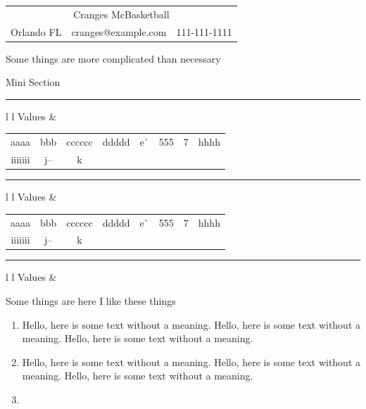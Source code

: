 \documentclass[12pt, a4paper]{article}
\begin{document}
\setlength{\arrayrulewidth}{0.6mm}

\begin{center}
    \begin{tabular}{c|c|c}
        \multicolumn{3}{c}{Cranges McBasketball} \\
        Orlando FL & cranges@example.com & 111-111-1111
    \end{tabular}
\end{center}

{\selectfont
Some things are more complicated than necessary
}

\selectfont
Mini Section
\\[-6mm]


\textcolor{gray}{\rule{\textwidth}{4pt}}


\begin{tabular}{l l}
Values \hspace{4 mm} &
\begin{tabular}{*{7}{c|}c}
    aaaa & bbb & cccccc & ddddd & e^^ & 555 & 7 & hhhh \\
    \arrayrulecolor[HTML]{FFFFFF}
    \hline
    \arrayrulecolor{gray}
    iiiiiii & j-- & k
\end{tabular}
\end{tabular}

\textcolor{gray}{\rule{\textwidth}{2pt}}

\begin{tabular}{l l}
    Values &
    \begin{tabular}{*{7}{c|}c}

        aaaa & bbb & cccccc & ddddd & e^^ & 555 & 7 & hhhh \\
        \arrayrulecolor[HTML]{FFFFFF}
        \hline
        \arrayrulecolor{gray}
        iiiiiii & j-- & k
    \end{tabular}
    \end{tabular}


\textcolor{gray}{\rule{\textwidth}{2pt}}


\begin{tabularx}{\textwidth}{l l}
    Values & 
     \end{tabularx}

\vspace{10mm}
Some things are here
I like these things

\newcommand{\rando} {Hello, here is some text without a meaning. Hello, here is some text without a meaning. Hello, here is some text without a meaning.}

\begin{enumerate}
    \item \rando
    \item \rando
    \item {}
\end{enumerate}
\end{document}

